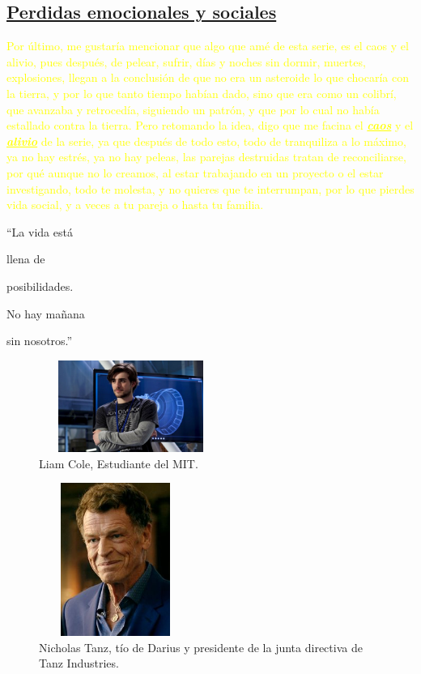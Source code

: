\documentclass[a5paper,11pt]{article}
\begin{document}
    \subsection{\large{\underline{Perdidas emocionales y sociales}}} \small{\textcolor{yellow}{Por último, me gustaría mencionar que algo que amé de esta serie, es el caos y el alivio, pues después, de pelear, sufrir, días y noches sin dormir, muertes, explosiones, llegan a la conclusión de que no era un asteroide lo que chocaría con la tierra, y  por lo que tanto tiempo habían dado, sino que era como un colibrí, que avanzaba y retrocedía, siguiendo un patrón, y que por lo cual no había estallado contra la tierra. Pero retomando la idea, digo que me facina el {\textbf{\emph{\underline{caos}}}} y el {\textbf{\emph{\underline{alivio}}}} de la serie, ya que
    después de todo esto, todo de tranquiliza a lo máximo, ya no hay estrés, ya no hay peleas, las parejas destruidas tratan de reconciliarse, por qué aunque no lo creamos, al estar trabajando en un proyecto o el estar investigando, todo te molesta, y no quieres que te interrumpan, por lo que pierdes vida social, y a veces a tu pareja o hasta tu familia.}}
    
\hspace{-3.5cm} ``La vida está 

\hspace{-3.5cm}llena de

\hspace{-3.5cm}posibilidades. 

\hspace{-3.5cm}No hay mañana

\hspace{-3.5cm}sin nosotros.''

\newpage{}
\begin{figure}

    \begin{flushright}
    \caption{Liam Cole, Estudiante del MIT. }
    \includegraphics[angle=-18,width=6cm,height=3cm]{Liam.jpg}
    \end{flushright}
\end{figure}

\begin{figure}

    \begin{flushright}
    \caption{Nicholas Tanz, tío de Darius y presidente de la junta
directiva de Tanz Industries.}
    \includegraphics[angle=8,width=5cm,height=5cm]{Nic.jpg}
    \end{flushright}
\end{figure} 
\end{document}
